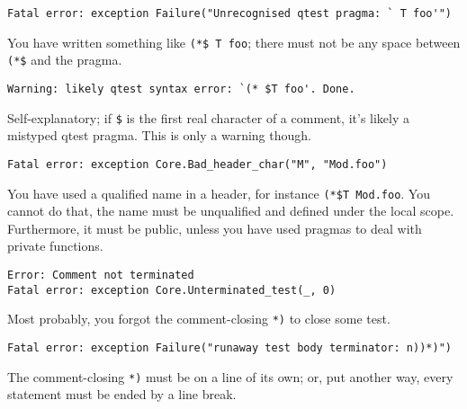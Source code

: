 
\Oconsole
\begin{verbatim}
Fatal error: exception Failure("Unrecognised qtest pragma: ` T foo'")
\end{verbatim}

You have written something like \texttt{(*\$ T foo}; there must not be any space
between \texttt{(*\$} and
the pragma.

\begin{verbatim}
Warning: likely qtest syntax error: `(* $T foo'. Done.
\end{verbatim}

Self-explanatory; if \texttt{\$} is the first real character of a comment, it's likely a mistyped
qtest pragma. This is only a warning though.

\begin{verbatim}
Fatal error: exception Core.Bad_header_char("M", "Mod.foo")
\end{verbatim}

You have used a qualified name in a header, for instance \texttt{(*\$T Mod.foo}. You cannot do
that, the name must be unqualified and defined under the local scope. Furthermore, it must
be public, unless you have used pragmas to deal with private functions.

\begin{verbatim}
Error: Comment not terminated
Fatal error: exception Core.Unterminated_test(_, 0)
\end{verbatim}

Most probably, you forgot the comment-closing \texttt{*)} to close some test.

\begin{verbatim}
Fatal error: exception Failure("runaway test body terminator: n))*)")
\end{verbatim}

The comment-closing \texttt{*)} must be on a line of its own; or, put another way, every
statement must be ended by a line break.